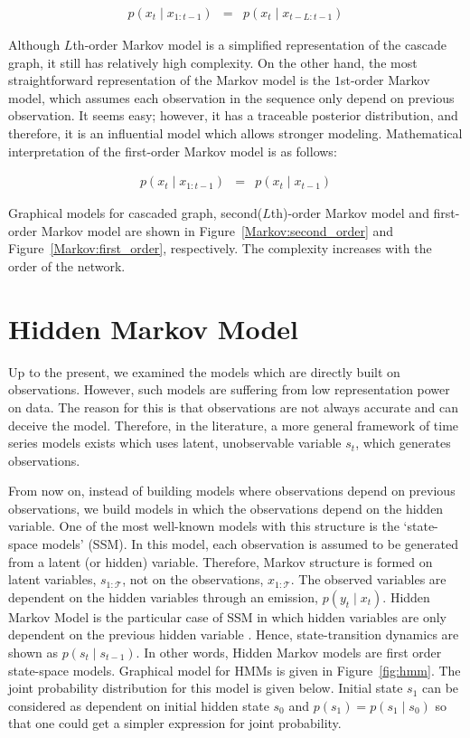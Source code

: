 \begin{eqnarray}
    p\left(x_{t} \mid x_{1 : t-1}\right) & = & p\left(x_{t} \mid x_{t-L : t-1}\right)
\end{eqnarray}

Although $L$th-order Markov model is a simplified representation of the cascade graph, it still has relatively high complexity. 
On the other hand, the most straightforward representation of the Markov model is the $1$st-order Markov model, which assumes each observation in the sequence only depend on previous observation. 
It seems easy; however, it has a traceable posterior distribution, and therefore, it is an influential model which allows stronger modeling.
Mathematical interpretation of the first-order Markov model is as follows:

\begin{eqnarray}
    p\left(x_{t} \mid x_{1 : t-1}\right) & = & p\left(x_{t} \mid x_{t-1}\right)
\end{eqnarray}

Graphical models for cascaded graph, second($L$th)-order Markov model and first-order Markov model are shown in Figure~\ref{Markov:second_order} and Figure~\ref{Markov:first_order}, respectively. 
The complexity increases with the order of the network.

\section{Hidden Markov Model}
Up to the present, we examined the models which are directly built on observations.
However, such models are suffering from low representation power on data.
The reason for this is that observations are not always accurate and can deceive the model. 
Therefore, in the literature, a more general framework of time series models exists which uses latent, unobservable variable $s_t$, which generates observations.

From now on, instead of building models where observations depend on previous observations, we build models in which the observations depend on the hidden variable.
One of the most well-known models with this structure is the `state-space models' (SSM). 
In this model, each observation is assumed to be generated from a latent (or hidden) variable.
Therefore, Markov structure is formed on latent variables, $s_{1:\mathcal{T}}$, not on the observations, $x_{1:\mathcal{T}}$.
The observed variables are dependent on the hidden variables through an emission, $p\left(y_t \mid x_t\right)$\cite{barber2012bayesian}. 
Hidden Markov Model is the particular case of SSM in which hidden variables are only dependent on the previous hidden variable \cite{rabiner1989tutorial}.
Hence, state-transition dynamics are shown as $p\left(s_{t} \mid s_{t-1}\right)$.
In other words, Hidden Markov models are first order state-space models. Graphical model for HMMs is given in Figure~\ref{fig:hmm}. The joint probability distribution for this model is given below.
Initial state $s_1$ can be considered as dependent on initial hidden state $s_0$ and $p\left(s_1\right) = p\left(s_1 \mid s_0\right)$ so that one could get a simpler expression for joint probability.

